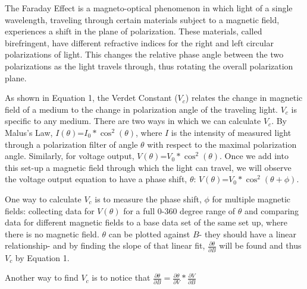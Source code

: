 \documentclass[prb,preprint]{revtex4-1}
\begin{document}
{The Faraday Effect is a magneto-optical phenomenon in which light of a single wavelength, traveling through certain materials subject to a magnetic field, experiences a shift in the plane of polarization. These materials, called birefringent, have different refractive indices for the right and left circular polarizations of light. This changes the relative phase angle between the two polarizations as the light travels through, thus rotating the overall polarization plane.

As shown in Equation 1, the Verdet Constant ($V_{c}$) relates the change in magnetic field of a medium to the change in polarization angle of the traveling light.  $V_{c}$ is specific to any medium.  There are two ways in which we can calculate $V_{c}$.  By Malus's Law, $I(\theta)$=$I_{0}*\cos^{2}(\theta)$, where $I$ is the intensity of measured light through a polarization filter of angle $\theta$ with respect to the maximal polarization angle.  Similarly, for voltage output, $V(\theta)$=$V_{0}*\cos^{2}(\theta)$.  Once we add into this set-up a magnetic field through which the light can travel, we will observe the voltage output equation to have a phase shift, $\theta$:  $V(\theta)$=$V_{0}*\cos^{2}(\theta+\phi)$.

One way to calculate $V_{c}$ is to measure the phase shift, $\phi$ for multiple magnetic fields:  collecting data for $V(\theta)$ for a full 0-360 degree range of $\theta$ and comparing data for different magnetic fields to a base data set of the same set up, where there is no magnetic field.  $\theta$ can be plotted against $B$- they should have a linear relationship- and by finding the slope of that linear fit, $\frac{\partial \theta}{\partial B}$ will be found and thus $V_{c}$ by Equation 1.}

{Another way to find $V_{c}$ is to notice that $\frac{\partial \theta}{\partial B}= \frac{\partial \theta}{\partial V}*\frac{\partial V}{\partial B}$}
\end{document}
